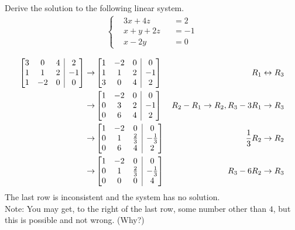 \begin{Exercise}
Derive the solution to the following linear system.
\begin{align*}
\left\{\begin{alignedat}{2}
& 3x + 4z & &= 2\\
& x + y + 2z & &= -1\\
& x - 2y & &= 0
\end{alignedat}\right.
\end{align*}
\end{Exercise}
\begin{Answer}
\begin{align*}
\left[
\begin{array}{@{}ccc|c@{}}
3 & 0 & 4 & 2\\
1 & 1 & 2 & -1\\
1 & -2 & 0 & 0
\end{array}
\right]
\to &
\left[
\begin{array}{@{}ccc|c@{}}
1 & -2 & 0 & 0\\
1 & 1 & 2 & -1\\
3 & 0 & 4 & 2\\
\end{array}
\right]
& R_1 \leftrightarrow R_3\\
\to &
\left[
\begin{array}{@{}ccc|c@{}}
1 & -2 & 0 & 0\\
0 & 3 & 2 & -1\\
0 & 6 & 4 & 2
\end{array}
\right]
& R_2 - R_1 \to R_2, R_3 - 3R_1 \to R_3 \\
\to &
\left[
\begin{array}{@{}ccc|c@{}}
1 & -2 & 0 & 0\\
0 & 1 & \frac{2}{3} & -\frac{1}{3}\\
0 & 6 & 4 & 2
\end{array}
\right] & \frac{1}{3}R_2 \to R_2 \\
\to &
\left[
\begin{array}{@{}ccc|c@{}}
1 & -2 & 0 & 0\\
0 & 1 & \frac{2}{3} & -\frac{1}{3}\\
0 & 0 & 0 & 4
\end{array}
\right] & R_3 - 6R_2 \to R_3
\end{align*}
The last row is inconsistent and the system has no solution.\\ 
Note: You may get, to the right of the last row, some number other than $4$, but this is possible and not wrong. (Why?)    
\end{Answer}

